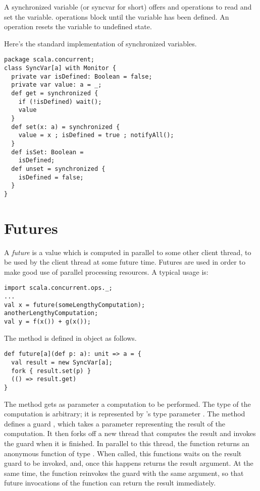 {A synchronized variable (or syncvar for short) offers  and
 operations to read and set the variable.  operations
block until the variable has been defined. An  operation
resets the variable to undefined state.

Here's the standard implementation of synchronized variables.
\begin{lstlisting}
package scala.concurrent;
class SyncVar[a] with Monitor {
  private var isDefined: Boolean = false;
  private var value: a = _;
  def get = synchronized {
    if (!isDefined) wait();
    value
  }
  def set(x: a) = synchronized {
    value = x ; isDefined = true ; notifyAll();
  }
  def isSet: Boolean = 
    isDefined;
  def unset = synchronized { 
    isDefined = false; 
  }
}
\end{lstlisting}

\section{Futures}
\label{sec:futures}

A {\em future} is a value which is computed in parallel to some other
client thread, to be used by the client thread at some future time.
Futures are used in order to make good use of parallel processing
resources.  A typical usage is:

\begin{lstlisting}
import scala.concurrent.ops._;
...
val x = future(someLengthyComputation);
anotherLengthyComputation;
val y = f(x()) + g(x());
\end{lstlisting}

The  method is defined in object
 as follows.
\begin{lstlisting}
def future[a](def p: a): unit => a = {
  val result = new SyncVar[a];
  fork { result.set(p) }
  (() => result.get)
}
\end{lstlisting}

The  method gets as parameter a computation  to
be performed. The type of the computation is arbitrary; it is
represented by 's type parameter .  The
 method defines a guard , which takes a
parameter representing the result of the computation. It then forks
off a new thread that computes the result and invokes the
 guard when it is finished. In parallel to this thread,
the function returns an anonymous function of type .
When called, this functions waits on the result guard to be
invoked, and, once this happens returns the result argument.
At the same time, the function reinvokes the  guard with
the same argument, so that future invocations of the function can
return the result immediately.

}
